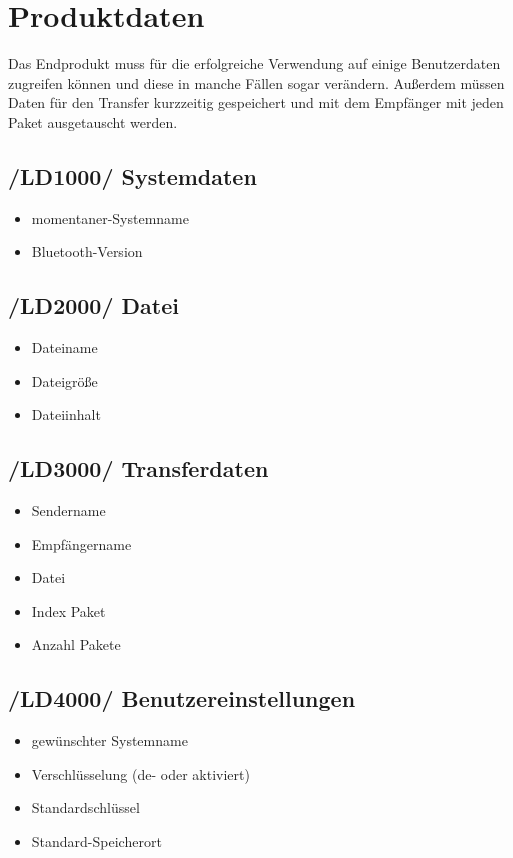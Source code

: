 \section{Produktdaten}
Das Endprodukt muss für die erfolgreiche Verwendung auf einige Benutzerdaten zugreifen können und diese in manche Fällen sogar verändern. Außerdem müssen Daten für den Transfer kurzzeitig gespeichert und mit dem Empfänger mit jeden Paket ausgetauscht werden.
\subsection{/LD1000/ Systemdaten}
\begin{itemize}
	\item momentaner-Systemname
	\item Bluetooth-Version
\end{itemize}
\subsection{/LD2000/ Datei}
\begin{itemize}
	\item Dateiname
	\item Dateigröße
	\item Dateiinhalt
\end{itemize}
\subsection{/LD3000/ Transferdaten}
\begin{itemize}
	\item Sendername
	\item Empfängername
	\item Datei
	\item Index Paket
	\item Anzahl Pakete
\end{itemize}
\subsection{/LD4000/ Benutzereinstellungen}
\begin{itemize}
	\item gewünschter Systemname
	\item Verschlüsselung (de- oder aktiviert)
	\item Standardschlüssel
	\item Standard-Speicherort
\end{itemize}